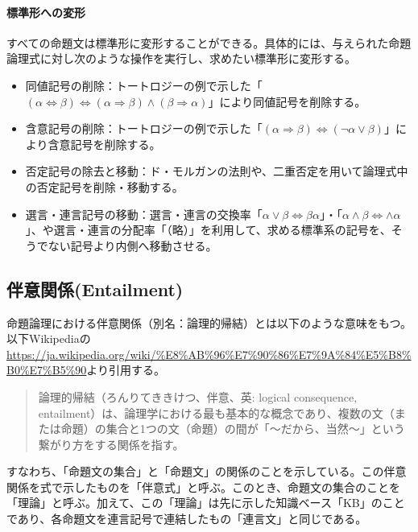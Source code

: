 \documentclass[dvipdfmx]{jsarticle}
\begin{document}
\paragraph{標準形への変形}すべての命題文は標準形に変形することができる。具体的には、与えられた命題論理式に対し次のような操作を実行し、求めたい標準形に変形する。
\begin{itemize}
  \item 同値記号の削除：トートロジーの例で示した「$(\alpha \Leftrightarrow \beta) \Leftrightarrow (\alpha \Rightarrow \beta) \wedge (\beta \Rightarrow \alpha)$」により同値記号を削除する。
  \item 含意記号の削除：トートロジーの例で示した「$(\alpha \Rightarrow \beta) \Leftrightarrow (\neg \alpha \vee \beta)$」により含意記号を削除する。
  \item 否定記号の除去と移動：ド・モルガンの法則や、二重否定を用いて論理式中の否定記号を削除・移動する。
  \item 選言・連言記号の移動：選言・連言の交換率「$\alpha \vee \beta \Leftrightarrow \beta \alpha$」・「$\alpha \wedge \beta \Leftrightarrow \wedge \alpha$」、や選言・連言の分配率「（略）」を利用して、求める標準系の記号を、そうでない記号より内側へ移動させる。
\end{itemize}


\subsection{伴意関係(Entailment)}
命題論理における伴意関係（別名：論理的帰結）とは以下のような意味をもつ。以下Wikipediaの\url{https://ja.wikipedia.org/wiki/%E8%AB%96%E7%90%86%E7%9A%84%E5%B8%B0%E7%B5%90}より引用する。
\begin{quote}
  論理的帰結（ろんりてききけつ、伴意、英: logical consequence, entailment）は、論理学における最も基本的な概念であり、複数の文（または命題）の集合と1つの文（命題）の間が「～だから、当然～」という繋がり方をする関係を指す。
\end{quote}
すなわち、「命題文の集合」と「命題文」の関係のことを示している。この伴意関係を式で示したものを「伴意式」と呼ぶ。このとき、命題文の集合のことを「理論」と呼ぶ。加えて、この「理論」は先に示した知識ベース「KB」のことであり、各命題文を連言記号で連結したもの「連言文」と同じである。
\end{document}
